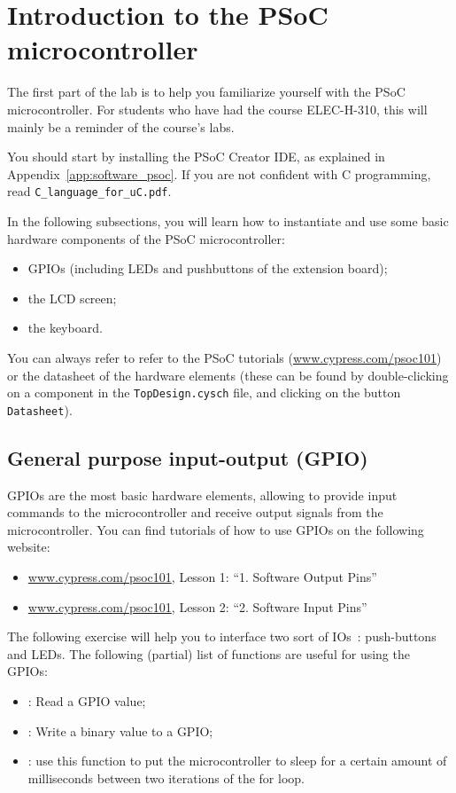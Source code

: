 
\section{Introduction to the PSoC microcontroller}

The first part of the lab is to help you familiarize yourself with the PSoC microcontroller. For students who have had the course ELEC-H-310, this will mainly be a reminder of the course's labs. 

You should start by installing the PSoC Creator IDE, as explained in Appendix~\ref{app:software_psoc}. If you are not confident with C programming, read \texttt{C\_language\_for\_uC.pdf}.

In the following subsections, you will learn how to instantiate and use some basic hardware components of the PSoC microcontroller: 
\begin{itemize}
	\item GPIOs (including LEDs and pushbuttons of the extension board); 
	\item the LCD screen; 
	\item the keyboard. 
\end{itemize}
You can always refer to refer to the PSoC tutorials (\url{www.cypress.com/psoc101}) or the datasheet of the hardware elements (these can be found by double-clicking on a component in the \texttt{TopDesign.cysch} file, and clicking on the button \texttt{Datasheet}). 




\subsection{General purpose input-output (GPIO)}

GPIOs are the most basic hardware elements, allowing to provide input commands to the microcontroller and receive output signals from the microcontroller. You can find tutorials of how to use GPIOs on the following website: 
\begin{itemize}
	\item \url{www.cypress.com/psoc101}, Lesson 1: ``1. Software Output Pins''
	\item \url{www.cypress.com/psoc101}, Lesson 2: ``2. Software Input Pins''
\end{itemize}
The following exercise will help you to interface two sort of IOs~: push-buttons and LEDs. The following (partial) list of functions are useful for using the GPIOs: 
\begin{itemize}
		\item {}: Read a GPIO value; 
		\item {}: Write a binary value to a GPIO;   
		\item {}: use this function to put the microcontroller to sleep for a certain amount of milliseconds between two iterations of the for loop. 
\end{itemize}

